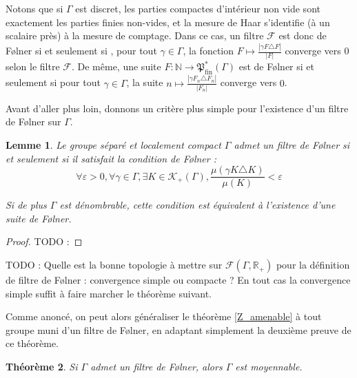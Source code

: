 \documentclass[a4paper,12pt]{article}
\newtheorem{theorem}{Théorème}[section]
\newtheorem{lemma}[theorem]{Lemme}
\newcommand{\R}{\mathbb{R}}
\newcommand{\N}{\mathbb{N}}
\newcommand{\abs}[1]{\left\vert#1\right\vert}
\newcommand{\card}[1]{\abs{#1}}
\newcommand{\ssi}{si et seulement si }
\newcommand{\finparts}{\mathfrak{P}_{\mathrm{fin}}}
\newcommand{\TODO}[1]{{\color{red}TODO :} #1}
\begin{document}
Notons que si $\Gamma$ est discret, 
les parties compactes d'intérieur non vide sont exactement les parties finies non-vides,
et la mesure de Haar s'identifie (à un scalaire près) à la mesure de comptage. Dans ce cas, un filtre $\mathscr{F}$
est donc de F\o{}lner \ssi, pour tout $\gamma\in\Gamma$, la fonction $F\mapsto \frac{\card{\gamma F\triangle F}}{\card{F}}$ 
converge vers $0$ selon le filtre $\mathscr{F}$. De même, une suite $F:\N\to\finparts^*(\Gamma)$
est de F\o{}lner \ssi pour tout $\gamma\in\Gamma$, la suite $n\mapsto\frac{\card{\gamma F_n\triangle F_n}}{\card{F_n}}$ converge 
vers $0$.

Avant d'aller plus loin, donnons un critère plus simple pour l'existence d'un filtre de F\o{}lner sur $\Gamma$.

\begin{lemma}
    Le groupe séparé et localement compact $\Gamma$ admet un filtre de F\o{}lner \ssi il satisfait la 
    \emph{condition de F\o{}lner} :
    \begin{equation}\label{Folner_cond}
        \forall\varepsilon>0, \forall \gamma\in\Gamma, \exists K\in\mathcal{K}_+(\Gamma), 
        \frac{\mu(\gamma K\triangle K)}{\mu(K)}<\varepsilon
    \end{equation}

    Si de plus $\Gamma$ est dénombrable, cette condition est équivalent à l'existence d'une suite de F\o{}lner.
\end{lemma}

\begin{proof}
    \TODO{}
\end{proof}

\TODO{Quelle est la bonne topologie à mettre sur $\mathcal{F}(\Gamma, \R_+)$ pour la définition de filtre de F\o{}lner : convergence simple ou compacte ?
    En tout cas la convergence simple suffit à faire marcher le théorème suivant.}

Comme anoncé, on peut alors généraliser le théorème \ref{Z_amenable} à tout groupe muni d'un filtre de F\o{}lner,
en adaptant simplement la deuxième preuve de ce théorème.

\begin{theorem}\label{amenable_of_Folner}
    Si $\Gamma$ admet un filtre de F\o{}lner, alors $\Gamma$ est moyennable.
\end{theorem}
\end{document}
